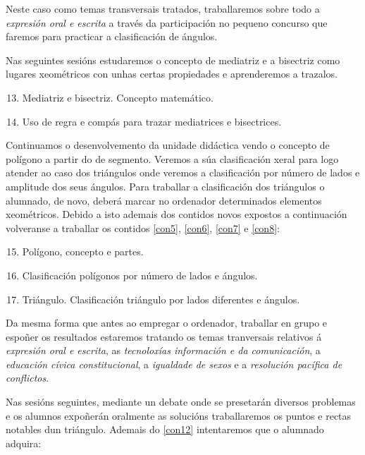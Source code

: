 Neste caso como temas transversais tratados, traballaremos sobre todo a \emph{expresión oral e escrita} a través da participación no pequeno concurso que faremos para practicar a clasificación de ángulos.

Nas seguintes sesións estudaremos o concepto de mediatriz e a bisectriz como lugares xeométricos con unhas certas propiedades e aprenderemos a trazalos.

\begin{enumerate}[label=\bfseries Con\arabic*, align=left, leftmargin=1.5cm]
    \setcounter{enumi}{12}
    \item\label{con13} Mediatriz e bisectriz. Concepto matemático.
    \item\label{con14} Uso de regra e compás para trazar mediatrices e bisectrices.
\end{enumerate}

Continuamos o desenvolvemento da unidade didáctica vendo o concepto de polígono a partir do de segmento. Veremos a súa clasificación xeral para logo atender ao caso dos triángulos onde veremos a clasificación por número de lados e amplitude dos seus ángulos. Para traballar a clasificación dos triángulos o alumnado, de novo, deberá marcar no ordenador determinados elementos xeométricos. Debido a isto ademais dos contidos novos expostos a continuación volveranse a traballar os contidos \ref{con5}, \ref{con6}, \ref{con7} e \ref{con8}:

\begin{enumerate}[label=\bfseries Con\arabic*, align=left, leftmargin=1.5cm]
  \setcounter{enumi}{14}
  \item\label{con15} Polígono, concepto e partes.
  \item\label{con16} Clasificación polígonos por número de lados e ángulos.
  \item\label{con17} Triángulo. Clasificación triángulo por lados diferentes e ángulos.
\end{enumerate}

Da mesma forma que antes ao empregar o ordenador, traballar en grupo e espoñer os resultados estaremos tratando os temas tranversais relativos á \emph{expresión oral e escrita}, as \emph{tecnoloxías información e da comunicación}, a \emph{educación cívica constitucional}, a \emph{igualdade de sexos} e a \emph{resolución pacífica de conflictos}.

Nas sesións seguintes, mediante un debate onde se presetarán diversos problemas e os alumnos expoñerán oralmente as solucións traballaremos os puntos e rectas notables dun triángulo. Ademais do \ref{con12} intentaremos que o alumnado adquira:

